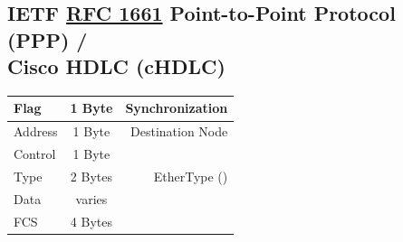 \documentclass[12pt]{article}
\newcommand{\RFC}[1]{\href{https://datatracker.ietf.org/doc/html/rfc#1}{RFC #1}}
\begin{document}
	\subsection[IETF RFC 1661 PPP / Cisco HDLC (cHDLC)]{IETF \RFC{1661} Point-to-Point Protocol (PPP) /\\Cisco HDLC (cHDLC) \label{subsec:IETF PPP}}
	\begin{table}[H]
	\centering
	\begin{tabular}{| l | c | r |}
	\hline
	Flag		& 1 Byte	& Synchronization\\\hline
	Address	& 1 Byte	& Destination Node\\\hline
	Control	& 1 Byte	&\\\hline
	Type		& 2 Bytes	& EtherType (\Cref{tab:ETHERTYPE})\\\hline
	Data		& varies	&\\\hline
	FCS		& 4 Bytes	&\\\hline
	\end{tabular}\end{table}





\end{document}
